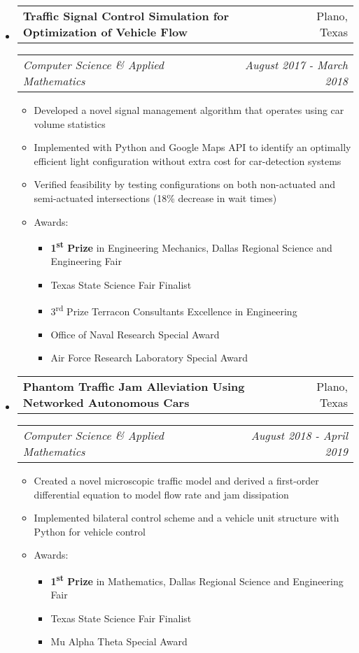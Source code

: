 \documentclass[letterpaper,11pt]{article}
\makeatletter
\newcommand{\resitem}[1]{\item #1 \vspace{-3pt}}
\newcommand{\ressubheading}[4]{
	\begin{tabular*}{7.0in}{l@{\extracolsep{\fill}}r}
			#1 & #2 \\
	\end{tabular*}
	\begin{tabular*}{7.0in}{l@{\extracolsep{\fill}}r}
			\textit{#3} & \textit{#4} \\
	\end{tabular*}\vspace{-6pt}}
\makeatother
\begin{document}
\begin{itemize}

\vspace{-3pt}

\item
	\ressubheading{\textbf{Traffic Signal Control Simulation for Optimization of Vehicle Flow}}{Plano, Texas}{Computer Science \& Applied Mathematics}{August 2017 - March 2018}
		\begin{itemize}
			\resitem{Developed a novel signal management algorithm that operates using car volume statistics} 
			\resitem{Implemented with Python and Google Maps API to identify an optimally efficient light configuration without extra cost for car-detection systems}
			\resitem{Verified feasibility by testing configurations on both non-actuated and semi-actuated intersections (18\% decrease in wait times)}
			\resitem{Awards:}
				\begin{itemize}
					\item[\textbullet] \textbf{1\textsuperscript{st} Prize} in Engineering Mechanics, Dallas Regional Science and Engineering Fair
					\item[\textbullet] Texas State Science Fair Finalist
					\item[\textbullet] 3\textsuperscript{rd} Prize Terracon Consultants Excellence in Engineering
					\item[\textbullet] Office of Naval Research Special Award
					\item[\textbullet] Air Force Research Laboratory Special Award
				\end{itemize}\vspace{-6pt}
		\end{itemize}
\item
	\ressubheading{\textbf{Phantom Traffic Jam Alleviation Using Networked Autonomous Cars}}{Plano, Texas}{Computer Science \& Applied Mathematics}{August 2018 - April 2019}
		\begin{itemize}
			\resitem{Created a novel microscopic traffic model and derived a first-order differential equation to model flow rate and jam dissipation} 
			\resitem{Implemented bilateral control scheme and a vehicle unit structure with Python for vehicle control}
			\resitem{Awards:}
				\begin{itemize}
					\item[\textbullet] \textbf{1\textsuperscript{st} Prize} in Mathematics, Dallas Regional Science and Engineering Fair
					\item[\textbullet] Texas State Science Fair Finalist
					\item[\textbullet] Mu Alpha Theta Special Award
				\end{itemize}\vspace{-6pt}
		\end{itemize}


\end{itemize}
\end{document}
